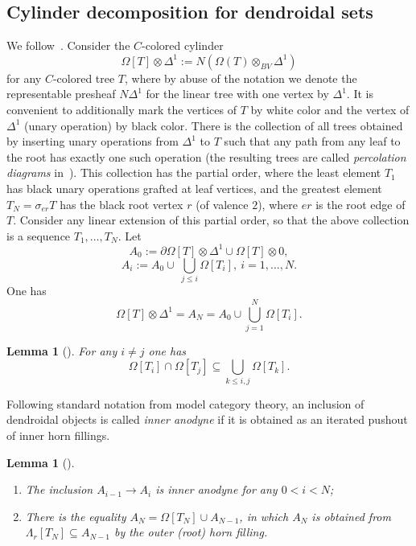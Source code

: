 \documentclass{amsart}
\newtheorem{lemma}[formula]{Lemma}
\theoremstyle{definition}
\theoremstyle{remark}
\renewcommand{\leq}{\leqslant}
\begin{document}
	\subsection{Cylinder decomposition for dendroidal sets}\label{ssec:cyldec}
	
	We follow~\cite{ci-mo-11}.
	Consider the $C$-colored cylinder
	\[
	\Omega[T]\otimes\Delta^{1}:=
	N(\Omega(T)\otimes_{BV}\Delta^{1})
	\]
	for any $C$-colored tree $T$, where by abuse of the notation we denote the representable presheaf $N\Delta^{1}$ for the linear tree with one vertex by $\Delta^{1}$.
	It is convenient to additionally mark the vertices of $T$ by white color and the vertex of $\Delta^{1}$ (unary operation) by black color.
	There is the collection of all trees obtained by inserting unary operations from $\Delta^{1}$ to $T$ such that any path from any leaf to the root has exactly one such operation (the resulting trees are called \textit{percolation diagrams} in~\cite{ci-mo-11}).
	This collection has the partial order, where the least element $T_{1}$ has black unary operations grafted at leaf vertices, and the greatest element $T_{N}=\sigma_{er} T$ has the black root vertex $r$ (of valence $2$), where $er$ is the root edge of $T$.
	Consider any linear extension of this partial order, so that the above collection is a sequence $T_{1},\dots,T_{N}$.
	Let 
	\[
	A_{0}:=
	\partial\Omega[T]\otimes\Delta^{1}\cup \Omega[T]\otimes 0,
	\]
	\[
	A_{i}:=A_{0} \cup\ \bigcup_{j\leq i} \Omega[T_{i}],\ 
	i=1,\dots,N.
	\]
	One has 
	\[
	\Omega[T]\otimes\Delta^{1}=
	A_{N}=
	A_{0} \cup \bigcup\limits_{j=1}^{N} \Omega[T_{i}].
	\]
	
	\begin{lemma}[{\cite[Lemma~5.6]{ci-mo-11}}]\label{lm:inter}
		For any $i\neq j$ one has 
		\[
		\Omega[T_{i}]\cap \Omega[T_{j}]\subseteq \bigcup\limits_{k\leq i,j} \Omega[T_{k}].
		\]
	\end{lemma}
	
	Following standard notation from model category theory, an inclusion of dendroidal objects is called \textit{inner anodyne} if it is obtained as an iterated pushout of inner horn fillings.
	
	\begin{lemma}[{\cite[Theorem~5.2]{ci-mo-11}}]\label{lm:fill}
		\begin{enumerate}[label=(\roman*)]
			\item The inclusion $A_{i-1}\to A_{i}$ is inner anodyne for any $0<i<N$;
			\item There is the equality $A_{N}=\Omega[T_{N}]\cup A_{N-1}$, in which $A_{N}$ is obtained from $\Lambda_{r}[T_{N}]\subseteq A_{N-1}$ by the outer (root) horn filling.
		\end{enumerate}
	\end{lemma}
	
\end{document}
